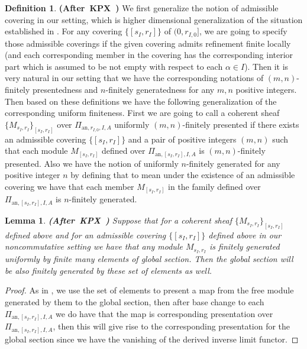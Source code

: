 \documentclass[12pt]{amsart}
\newtheorem{lemma}[theorem]{Lemma}
\theoremstyle{definition}
\newtheorem{definition}[theorem]{Definition}
\numberwithin{equation}{section}
\begin{document}
	


 











\begin{definition} \mbox{\bf{(After KPX \cite[Definition 2.1.9]{KPX})}} 
We first generalize the notion of admissible covering in our setting, which is higher dimensional generalization of the situation established in \cite[Definition 2.1.9]{KPX}. For any covering $\{[s_I,r_I]\}$ of $(0,r_{I,0}]$, we are going to specify those admissible coverings if the given covering admits refinement finite locally (and each corresponding member in the covering has the corresponding interior part which is assumed to be not empty with respect to each $\alpha\in I$). Then it is very natural in our setting that we have the corresponding notations of $(m,n)$-finitely presentedness and $n$-finitely generatedness for any $m,n$ positive integers. Then based on these definitions we have the following generalization of the corresponding uniform finiteness. First we are going to call a coherent sheaf $\{M_{s_I,r_I}\}_{[s_I,r_I]}$ over $\Pi_{\mathrm{an},r_{I,0},I,A}$ uniformly $(m,n)$-finitely presented if there exists an admissible covering $\{[s_I,r_I]\}$ and a pair of positive integers $(m,n)$ such that each module $M_{[s_I,r_I]}$ defined over $\Pi_{\mathrm{an},[s_I,r_I],I,A}$ is $(m,n)$-finitely presented. Also we have the notion of uniformly $n$-finitely generated for any positive integer $n$ by defining that to mean under the existence of an admissible covering we have that each member $M_{[s_I,r_I]}$ in the family defined over $\Pi_{\mathrm{an},[s_I,r_I],I,A}$ is $n$-finitely generated. 
\end{definition}



\begin{lemma}\mbox{\bf{(After KPX \cite[Lemma 2.1.11]{KPX})}} Suppose that for a coherent sheaf $\{M_{s_I,r_I}\}_{[s_I,r_I]}$ defined above and for an admissible covering $\{[s_I,r_I]\}$ defined above in our noncommutative setting we have that any module $M_{s_I,r_I}$ is finitely generated uniformly by finite many elements of global section. Then the global section will be also finitely generated by these set of elements as well. 
	
\end{lemma}


\begin{proof}
As in \cite[Lemma 2.1.11]{KPX}, we use the set of elements to present a map from the free module generated by them to the global section, then after base change to each $\Pi_{\mathrm{an},[s_I,r_I],I,A}$ we do have that the map is corresponding presentation over $\Pi_{\mathrm{an},[s_I,r_I],I,A}$, then this will give rise to the corresponding presentation for the global section since we have the vanishing of the derived inverse limit functor.	
\end{proof}
\end{document}
